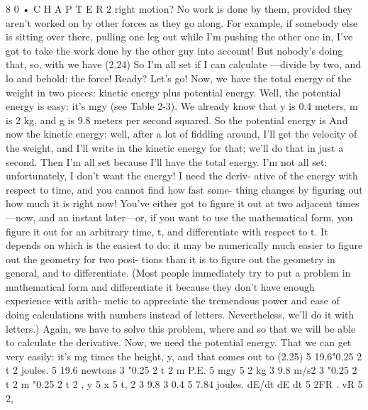 \documentclass[10pt,oneside]{article}
\begin{document}
8 0 • C H A P T E R  2 right motion? No work is done by them, provided they aren’t worked on by other forces as they go along. For example, if somebody else is sitting over there, pulling one leg out while I’m pushing the other one in, I’ve got to take the work done by the other guy into account! But nobody’s doing that, so, with we have (2.24) So I’m all set if I can calculate ---divide by two, and lo and behold: the force! Ready? Let’s go! Now, we have the total energy of the weight in two pieces: kinetic energy plus potential energy. Well, the potential energy is easy: it’s mgy (see Table 2-3). We already know that y is 0.4 meters, m is 2 kg, and g is 9.8 meters per second squared. So the potential energy is And now the kinetic energy: well, after a lot of fiddling around, I’ll get the velocity of the weight, and I’ll write in the kinetic energy for that; we’ll do that in just a second. Then I’m all set because I’ll have the total energy. I’m not all set: unfortunately, I don’t want the energy! I need the deriv- ative of the energy with respect to time, and you cannot find how fast some- thing changes by figuring out how much it is right now! You’ve either got to figure it out at two adjacent times---now, and an instant later---or, if you want to use the mathematical form, you figure it out for an arbitrary time, t, and differentiate with respect to t. It depends on which is the easiest to do: it may be numerically much easier to figure out the geometry for two posi- tions than it is to figure out the geometry in general, and to differentiate. (Most people immediately try to put a problem in mathematical form and differentiate it because they don’t have enough experience with arith- metic to appreciate the tremendous power and ease of doing calculations with numbers instead of letters. Nevertheless, we’ll do it with letters.) Again, we have to solve this problem, where and so that we will be able to calculate the derivative. Now, we need the potential energy. That we can get very easily: it’s mg times the height, y, and that comes out to (2.25) 5 19.6"0.25 2 t 2 joules. 5 19.6 newtons 3 "0.25 2 t 2 m P.E. 5 mgy 5 2 kg 3 9.8 m/s2 3 "0.25 2 t 2 m "0.25 2 t 2 , y 5 x 5 t, 2 3 9.8 3 0.4 5 7.84 joules. dE/dt dE dt 5 2FR . vR 5 2,\par
\end{document}
